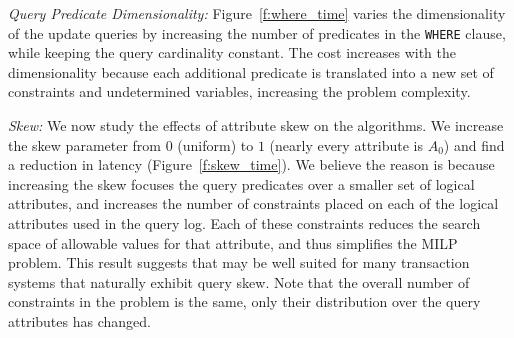 
\emph{Query Predicate Dimensionality:}
Figure~\ref{f:where_time} varies the dimensionality of the update queries by increasing the number of predicates in the \texttt{WHERE} clause, while keeping the query cardinality constant.
The cost increases with the dimensionality because each additional predicate is translated into a new set of constraints and undetermined variables, increasing the problem complexity.



\emph{Skew:} We now study the effects of attribute skew on the algorithms.
We increase the skew parameter from $0$ (uniform) to $1$ (nearly every attribute is $A_0$) 
and find a reduction in latency (Figure~\ref{f:skew_time}).
We believe the reason is because increasing the skew focuses the query predicates over a smaller set of logical attributes, 
and increases the number of constraints placed on each of the logical attributes used in the query log.  
Each of these constraints reduces the search space of allowable values for that attribute, and thus simplifies the MILP problem.
This result suggests that \sys may be well suited for many transaction systems that naturally exhibit query skew.
Note that the overall number of constraints in the problem is the same, only their distribution over the query attributes has changed.


